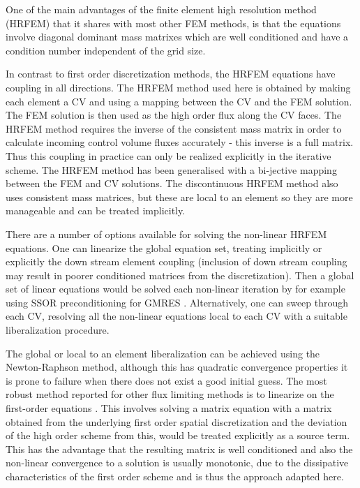 One of the main advantages of the finite element high resolution method (HRFEM) that it shares with most other FEM methods, is that the equations involve diagonal dominant mass matrixes which are well conditioned and have a condition number independent of the grid size.

In contrast to first order discretization methods, the HRFEM equations have coupling in all directions. The HRFEM method used here is obtained by making each element a CV and using a mapping between the CV and the FEM solution. The FEM solution is then used as the high order flux along the CV faces. The HRFEM method requires the inverse of the consistent mass matrix in order to calculate incoming control volume fluxes accurately - this inverse is a full matrix. Thus this coupling in practice can only be realized explicitly in the iterative scheme.  The HRFEM method has been generalised with a bi-jective mapping between the FEM and CV solutions. The discontinuous HRFEM method also uses consistent mass matrices, but these are local to an element so they are more manageable and can be treated implicitly.

There are a number of options available for solving the non-linear HRFEM equations. One can linearize the global equation set, treating implicitly or explicitly the down stream element coupling (inclusion of down stream coupling may result in poorer conditioned matrices from the discretization). Then a global set of linear equations would be solved each non-linear iteration by for example using SSOR preconditioning for GMRES \citep{saad_1986}.  Alternatively, one can sweep through each CV, resolving all the non-linear equations local to each CV with a suitable liberalization procedure.

The global or local to an element liberalization can be achieved using the Newton-Raphson method, although this has quadratic convergence properties it is prone to failure when there does not exist a good initial guess. The most robust method reported for other flux limiting methods is to linearize on the first-order equations \citep[see][]{darwish_1993}.  This involves solving a matrix equation with a matrix obtained from the underlying first order spatial discretization and the deviation of the high order scheme from this, would be treated explicitly as a source term. This has the advantage that the resulting matrix is well conditioned and also the non-linear convergence to a solution is usually monotonic, due to the dissipative characteristics of the first order scheme and is thus the approach adapted here.

